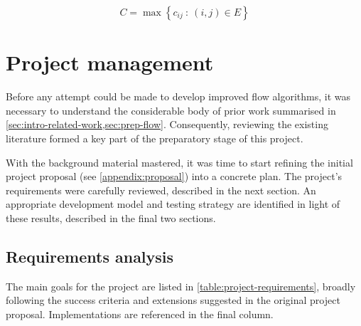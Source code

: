\begin{equation}
C=\max\left\{ c_{ij}\::\:(i,j)\in E\right\} 
\end{equation}

\section{Project management}

Before any attempt could be made to develop improved flow algorithms, it was necessary to understand the considerable body of prior work  summarised in \cref{sec:intro-related-work,sec:prep-flow}. Consequently, reviewing the existing literature formed a key part of the preparatory stage of this project. 

With the background material mastered, it was time to start refining the initial project proposal (see \cref{appendix:proposal}) into a concrete plan. The project's requirements were carefully reviewed, described in the next section. An appropriate development model and testing strategy are identified in light of these results, described in the final two sections.

\subsection{Requirements analysis} \label{sec:prep-management-requirements}



The main goals for the project are listed in \cref{table:project-requirements}, broadly following the success criteria and extensions suggested in the original project proposal. Implementations are referenced in the final column.

